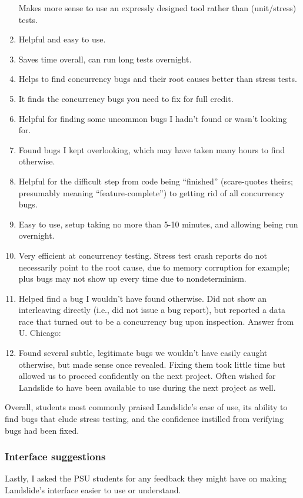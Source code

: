 \begin{enumerate}
		Makes more sense to use an expressly designed tool rather than (unit/stress) tests.
	\item Helpful and easy to use.
	\item Saves time overall, can run long tests overnight.
	\item Helps to find concurrency bugs and their root causes better than stress tests.
	\item It finds the concurrency bugs you need to fix for full credit.
	\item Helpful for finding some uncommon bugs I hadn't found or wasn't looking for.
	\item Found bugs I kept overlooking, which may have taken many hours to find otherwise.
	\item Helpful for the difficult step from code being ``finished'' (scare-quotes theirs; presumably meaning ``feature-complete'')
		to getting rid of all concurrency bugs.
	\item Easy to use, setup taking no more than 5-10 minutes, and allowing being run overnight.
	\item Very efficient at concurrency testing.
		Stress test crash reports do not necessarily point to the root cause, due to memory corruption for example;
		plus bugs may not show up every time due to nondeterminism.
	\item Helped find a bug I wouldn't have found otherwise.
		Did not show an interleaving directly (i.e., did not issue a bug report),
		but reported a data race that turned out to be a concurrency bug upon inspection.
Answer from U. Chicago:
	\item Found several subtle, legitimate bugs we wouldn't have easily caught otherwise, but made sense once revealed.
		Fixing them took little time but allowed us to proceed confidently on the next project.
		Often wished for Landslide to have been available to use during the next project as well.
\end{enumerate}

\noindent
Overall, students most commonly praised Landslide's ease of use,
its ability to find bugs that elude stress testing,
and the confidence instilled from verifying bugs had been fixed.

\subsubsection{Interface suggestions}

Lastly, I asked the PSU students for any feedback they might have on making Landslide's interface easier to use or understand.

